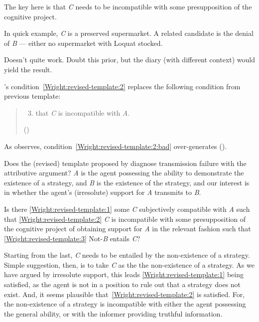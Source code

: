 \documentclass[10pt]{article}
\begin{document}
\begin{note}
  The key here is that \emph{C} needs to be incompatible with some presupposition of the cognitive project.

  In quick example, \emph{C} is a preserved supermarket.
  A related candidate is the denial of \emph{B} --- either no supermarket with Loquat stocked.

  Doesn't quite work.
  Doubt this prior, but the diary (with different context) would yield the result.

  \citeauthor{Wright:2011wn}'s condition~\ref{Wright:revised-template:2} replaces the following condition from previous template:
  \begin{quote}
    \begin{enumerate}[label=(\roman*\(^{-}\)), ref=(\roman*\(^{-}\))]
      \setcounter{enumi}{2}
    \item\label{Wright:revised-template:2:bad} that \emph{C} is incompatible with \emph{A}.
    \end{enumerate}
    \mbox{}\hfill\mbox{(\citeyear[88]{Wright:2011wn})}
  \end{quote}
  As \citeauthor{Wright:2011wn} observes, condition~\ref{Wright:revised-template:2:bad} over-generates (\citeyear[90--92]{Wright:2011wn}).
\end{note}


\begin{note}
  Does the (revised) template proposed by \citeauthor{Wright:2011wn} diagnose transmission failure with the attributive argument?
  \emph{A} is the agent possessing the ability to demonstrate the existence of a strategy, and \emph{B} is the existence of the strategy, and our interest is in whether the agent's (irresolute) support for \emph{A} transmits to \emph{B}.

  Is there \ref{Wright:revised-template:1} some \emph{C} subjectively compatible with \emph{A}  such that \ref{Wright:revised-template:2} \emph{C} is incompatible with some presupposition of the cognitive project of obtaining support for \emph{A} in the relevant fashion  such that \ref{Wright:revised-template:3} Not-\emph{B} entails \emph{C}?

  Starting from the last, \emph{C} needs to be entailed by the non-existence of a strategy.
  Simple suggestion, then, is to take \emph{C} as the the non-existence of a strategy.
  As we have argued by irresolute support, this leads \ref{Wright:revised-template:1} being satisfied, as the agent is not in a position to rule out that a strategy does not exist.
  And, it seems plausible that~\ref{Wright:revised-template:2} is satisfied.
  For, the non-existence of a strategy is incompatible with either the agent possessing the general ability, or with the informer providing truthful information.
\end{note}
\end{document}
